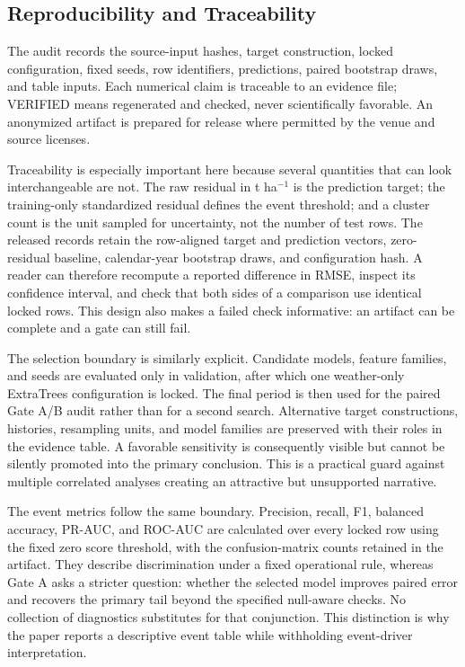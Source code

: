 \documentclass[conference]{IEEEtran}
\begin{document}
\subsection{Reproducibility and Traceability}
The audit records the source-input hashes, target construction, locked
configuration, fixed seeds, row identifiers, predictions, paired bootstrap draws,
and table inputs. Each numerical claim is traceable to an evidence file; VERIFIED
means regenerated and checked, never scientifically favorable. An anonymized
artifact is prepared for release where permitted by the venue and source licenses.

Traceability is especially important here because several quantities that can look
interchangeable are not. The raw residual in t ha$^{-1}$ is the prediction target;
the training-only standardized residual defines the event threshold; and a cluster
count is the unit sampled for uncertainty, not the number of test rows. The released
records retain the row-aligned target and prediction vectors, zero-residual baseline,
calendar-year bootstrap draws, and configuration hash. A reader can therefore
recompute a reported difference in RMSE, inspect its confidence interval, and check
that both sides of a comparison use identical locked rows. This design also makes a
failed check informative: an artifact can be complete and a gate can still fail.

The selection boundary is similarly explicit. Candidate models, feature families,
and seeds are evaluated only in validation, after which one weather-only ExtraTrees
configuration is locked. The final period is then used for the paired Gate A/B audit
rather than for a second search. Alternative target constructions, histories,
resampling units, and model families are preserved with their roles in the evidence
table. A favorable sensitivity is consequently visible but cannot be silently
promoted into the primary conclusion. This is a practical guard against multiple
correlated analyses creating an attractive but unsupported narrative.

The event metrics follow the same boundary. Precision, recall, F1, balanced
accuracy, PR-AUC, and ROC-AUC are calculated over every locked row using the fixed
zero score threshold, with the confusion-matrix counts retained in the artifact.
They describe discrimination under a fixed operational rule, whereas Gate A asks a
stricter question: whether the selected model improves paired error and recovers
the primary tail beyond the specified null-aware checks. No collection of
diagnostics substitutes for that conjunction. This distinction is why the paper
reports a descriptive event table while withholding event-driver interpretation.
\end{document}
